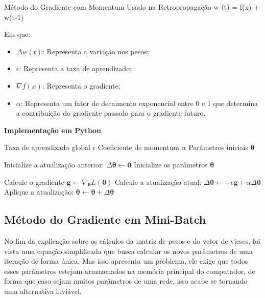 \begin{equacaodestaque}{Método do Gradiente com Momentum Usado na Retropropagação}
        \Delta w (t) = \epsilon \nabla f(x) + \alpha \Delta w(t-1)
    \label{eq:metodo-do-gradiente-com-momentum-da-retropropagacao}
\end{equacaodestaque}

Em que:

\begin{itemize}
    \item $\Delta w(t)$: Representa a variação nos pesos;
    \item $\epsilon$: Representa a taxa de aprendizado;
    \item $\nabla f(x)$: Representa o gradiente;
    \item $\alpha$: Representa um fator de decaimento exponencial entre 0 e 1 que determina a contribuição do gradiente passado para o gradiente futuro.
\end{itemize}

\textbf{Implementação em Python}

\begin{algorithm}[H]
\caption{O Método do Gradiente com Momentum (versão de Rumelhart et al.)}
\label{alg:momentum_rumelhart}
\begin{algorithmic}[1]
\Require Taxa de aprendizado global $\epsilon$
\Require Coeficiente de momentum $\alpha$
\Require Parâmetros iniciais $\boldsymbol{\theta}$

\State Inicialize a atualização anterior: $\Delta\boldsymbol{\theta} \gets \mathbf{0}$
\State Inicialize os parâmetros $\boldsymbol{\theta}$

    \State Calcule o gradiente $\mathbf{g} \gets \nabla_{\boldsymbol{\theta}} L(\boldsymbol{\theta})$
    \State Calcule a atualização atual: $\Delta\boldsymbol{\theta} \gets -\epsilon \mathbf{g} + \alpha \Delta\boldsymbol{\theta}$
    \State Aplique a atualização: $\boldsymbol{\theta} \gets \boldsymbol{\theta} + \Delta\boldsymbol{\theta}$
\EndWhile
\end{algorithmic}
\end{algorithm}

\subsection{Método do Gradiente em Mini-Batch}

No fim da explicação sobre os cálculos da matriz de pesos e do vetor de vieses, foi vista uma equação simplificada que busca calcular os novos parâmetros de uma iteração de forma única. Mas isso apresenta um problema, ele exige que todos esses parâmetros estejam armazenados na memória principal do computador, de forma que caso sejam muitos parâmetros de uma rede, isso acabe se tornando uma alternativa inviável. 

